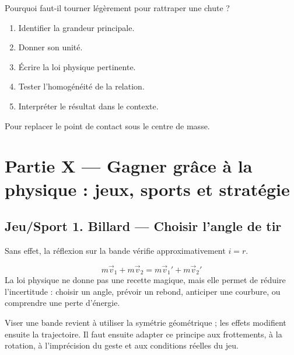 \documentclass[11pt,a4paper]{article}
\begin{document}
\begin{exercicebox}
Pourquoi faut-il tourner légèrement pour rattraper une chute ?
\begin{enumerate}
  \item Identifier la grandeur principale.
  \item Donner son unité.
  \item Écrire la loi physique pertinente.
  \item Tester l'homogénéité de la relation.
  \item Interpréter le résultat dans le contexte.
\end{enumerate}
\end{exercicebox}

\begin{corrigebox}[Indication]
Pour replacer le point de contact sous le centre de masse.
\end{corrigebox}


\section{Partie X — Gagner grâce à la physique : jeux, sports et stratégie}


\subsection{Jeu/Sport 1. Billard — Choisir l'angle de tir}

\begin{exemplebox}[Observation]
Sans effet, la réflexion sur la bande vérifie approximativement $i=r$.
\end{exemplebox}

\begin{theorembox}
\[
m\vec v_1+m\vec v_2=m\vec v_1'+m\vec v_2'
\]
La loi physique ne donne pas une recette magique, mais elle permet de réduire l'incertitude : choisir un angle, prévoir un rebond, anticiper une courbure, ou comprendre une perte d'énergie.
\end{theorembox}

\begin{methodebox}
Viser une bande revient à utiliser la symétrie géométrique ; les effets modifient ensuite la trajectoire.
Il faut ensuite adapter ce principe aux frottements, à la rotation, à l'imprécision du geste et aux conditions réelles du jeu.
\end{methodebox}
\end{document}

